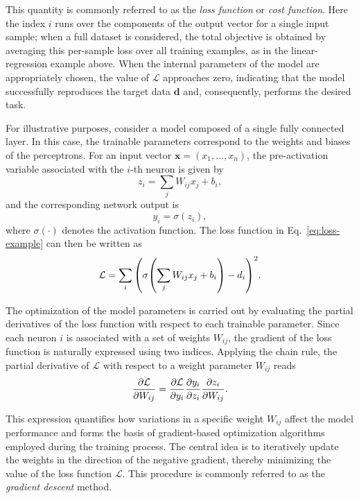 This quantity is commonly referred to as the \emph{loss function} or \emph{cost function}. Here the index $i$ runs over the components of the output vector for a single input sample; when a full dataset is considered, the total objective is obtained by averaging this per-sample loss over all training examples, as in the linear-regression example above. When the internal parameters of the model are appropriately chosen, the value of $\mathcal{L}$ approaches zero, indicating that the model successfully reproduces the target data $\mathbf{d}$ and, consequently, performs the desired task.

For illustrative purposes, consider a model composed of a single fully connected layer. In this case, the trainable parameters correspond to the weights and biases of the perceptrons. For an input vector $\mathbf{x} = (x_1,\dots,x_n)$, the pre-activation variable associated with the $i$-th neuron is given by
\begin{equation}
    z_i = \sum_j W_{ij} x_j + b_i ,
\end{equation}
and the corresponding network output is
\begin{equation}
    y_i = \sigma(z_i),
\end{equation}
where $\sigma(\cdot)$ denotes the activation function. The loss function in Eq.~\eqref{eq:loss-example} can then be written as
\begin{equation}
    \mathcal{L} = \sum_i \qty( \sigma\qty( \sum_j W_{ij} x_j + b_i ) - d_i )^2 .
\end{equation}

The optimization of the model parameters is carried out by evaluating the partial derivatives of the loss function with respect to each trainable parameter. Since each neuron $i$ is associated with a set of weights $W_{ij}$, the gradient of the loss function is naturally expressed using two indices. Applying the chain rule, the partial derivative of $\mathcal{L}$ with respect to a weight parameter $W_{ij}$ reads
\begin{equation}
    \pdv{\mathcal{L}}{W_{ij}}
    =
    \pdv{\mathcal{L}}{y_i}
    \pdv{y_i}{z_i}
    \pdv{z_i}{W_{ij}} .
\end{equation}

This expression quantifies how variations in a specific weight $W_{ij}$ affect the model performance and forms the basis of gradient-based optimization algorithms employed during the training process. The central idea is to iteratively update the weights in the direction of the negative gradient, thereby minimizing the value of the loss function $\mathcal{L}$. This procedure is commonly referred to as the \emph{gradient descent} method.

